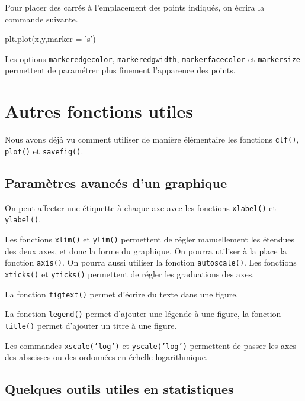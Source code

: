 \begin{exemple}
  Pour placer des carrés à l'emplacement des points indiqués, on écrira la commande suivante.
\begin{pyverbatim}
plt.plot(x,y,marker = 's')
\end{pyverbatim}
\end{exemple}

\begin{rem}
  Les options \texttt{markeredgecolor}, \texttt{markeredgwidth}, \texttt{markerfacecolor} et \texttt{markersize} permettent de paramétrer plus finement l'apparence des points. 
\end{rem}

\section{Autres fonctions utiles}

Nous avons déjà vu comment utiliser de manière élémentaire les fonctions \texttt{clf()}, \texttt{plot()} et \texttt{savefig()}.

\subsection{Paramètres avancés d'un graphique}

On peut affecter une étiquette à chaque axe avec les fonctions \texttt{xlabel()} et \texttt{ylabel()}.

Les fonctions \texttt{xlim()} et \texttt{ylim()} permettent de régler manuellement les étendues des deux axes, et donc la forme du graphique. On pourra utiliser à la place la fonction \texttt{axis()}.
On pourra aussi utiliser la fonction \texttt{autoscale()}.
Les fonctions \texttt{xticks()} et \texttt{yticks()} permettent de régler les graduations des axes. 

La fonction \texttt{figtext()} permet d'écrire du texte dans une figure. 

La fonction \texttt{legend()} permet d'ajouter une légende à une figure, la fonction \texttt{title()} permet d'ajouter un titre à une figure. 

Les commandes \texttt{xscale('log')} et \texttt{yscale('log')} permettent de passer les axes des abscisses ou des ordonnées en échelle logarithmique. 

\subsection{Quelques outils utiles en statistiques}

